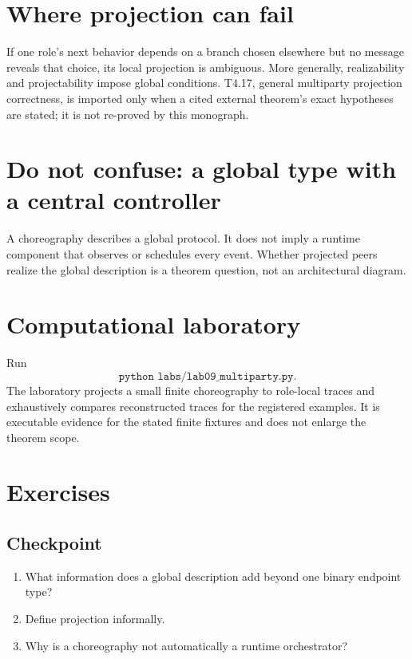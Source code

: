 \section{Where projection can fail}
If one role's next behavior depends on a branch chosen elsewhere but no message reveals that choice, its local projection is ambiguous. More generally, realizability and projectability impose global conditions. T4.17, general multiparty projection correctness, is imported only when a cited external theorem's exact hypotheses are stated; it is not re-proved by this monograph.



\section{Do not confuse: a global type with a central controller}
\begin{warningbox}
A choreography describes a global protocol. It does not imply a runtime component that observes or schedules every event. Whether projected peers realize the global description is a theorem question, not an architectural diagram.
\end{warningbox}



\section{Computational laboratory}
\begin{labbox}
Run
\[
  \texttt{python labs/lab09_multiparty.py}.
\]
The laboratory projects a small finite choreography to role-local traces and exhaustively compares reconstructed traces for the registered examples. It is executable evidence for the stated finite fixtures and does not enlarge the theorem scope.
\end{labbox}

\section{Exercises}
\subsection*{Checkpoint}
\begin{enumerate}[label=\textbf{9.\arabic*},start=1]
\item What information does a global description add beyond one binary endpoint type?
\item Define projection informally.
\item Why is a choreography not automatically a runtime orchestrator?
\end{enumerate}
